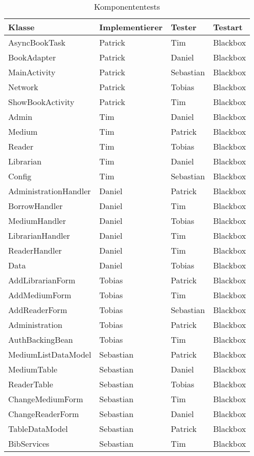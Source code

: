 \documentclass[fontsize=12pt,paper=a4,twoside]{scrartcl}
\begin{document}
{\begin{table}[h]
\centering
\begin{tabular}{|l|p{3cm}|p{3cm}|l|}
\hline
Klasse & Implementierer & Tester & Testart \\
\hline
AsyncBookTask & Patrick  & Tim    & Blackbox \\
BookAdapter      & Patrick   & Daniel   & Blackbox \\
MainActivity     & Patrick  & Sebastian   & Blackbox \\
Network      & Patrick  & Tobias    & Blackbox \\
ShowBookActivity      & Patrick  & Tim    & Blackbox \\
Admin      & Tim  & Daniel    & Blackbox \\
Medium      & Tim  & Patrick    & Blackbox \\
Reader      & Tim  & Tobias    & Blackbox \\
Librarian      & Tim  & Daniel    & Blackbox \\
Config      & Tim  & Sebastian    & Blackbox \\
AdministrationHandler      & Daniel  & Patrick    & Blackbox \\
BorrowHandler      & Daniel  & Tim    & Blackbox \\
MediumHandler      & Daniel  & Tobias    & Blackbox \\
LibrarianHandler      & Daniel  & Tim    & Blackbox \\
ReaderHandler      & Daniel  & Tim    & Blackbox \\
Data      & Daniel  & Tobias    & Blackbox \\
AddLibrarianForm      & Tobias  & Patrick    & Blackbox \\
AddMediumForm      & Tobias  & Tim    & Blackbox \\
AddReaderForm      & Tobias  & Sebastian    & Blackbox \\
Administration      & Tobias  & Patrick    & Blackbox \\
AuthBackingBean      & Tobias  & Tim    & Blackbox \\
MediumListDataModel      & Sebastian  & Patrick    & Blackbox \\
MediumTable      & Sebastian  & Daniel    & Blackbox \\
ReaderTable      & Sebastian  & Tobias    & Blackbox \\
ChangeMediumForm      & Sebastian  & Tim    & Blackbox \\
ChangeReaderForm      & Sebastian  & Daniel    & Blackbox \\
TableDataModel      & Sebastian  & Patrick    & Blackbox \\
BibServices      & Sebastian  & Tim    & Blackbox \\
\hline
\end{tabular}
\caption{Komponententests}
\label{tab:komponententests}
\end{table}

}
\end{document}
